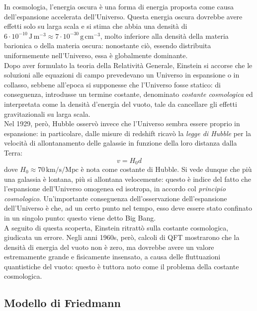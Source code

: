 In cosmologia, l'energia oscura è una forma di energia proposta come causa dell'espansione accelerata dell'Universo. Questa energia oscura dovrebbe avere effetti solo su larga scala e si stima che abbia una densità di $ 6 \cdot 10^{-10} \,\text{J} \,\text{m}^{-3} \approx 7 \cdot 10^{-30} \,\text{g} \,\text{cm}^{-3} $, molto inferiore alla densità della materia barionica o della materia oscura: nonostante ciò, essendo distribuita uniformemente nell'Universo, essa è globalmente dominante.\\
Dopo aver formulato la teoria della Relatività Generale, Einstein si accorse che le soluzioni alle equazioni di campo prevedevano un Universo in espansione o in collasso, sebbene all'epoca si supponesse che l'Universo fosse statico: di conseguenza, introdusse un termine costante, denominato \textit{costante cosmologica} ed interpretata come la densità d'energia del vuoto, tale da cancellare gli effetti gravitazionali su larga scala.\\
Nel 1929, però, Hubble osservò invece che l'Universo sembra essere proprio in espansione: in particolare, dalle misure di redshift ricavò la \textit{legge di Hubble} per la velocità di allontanamento delle galassie in funzione della loro distanza dalla Terra:
\begin{equation}
	v = H_0 d
	\label{eq:11.4}
\end{equation}
dove $ H_0 \approx 70 \,\text{km}/\text{s} / \text{Mpc} $ è nota come costante di Hubble. Si vede dunque che più una galassia è lontana, più si allontana velocemente: questo è indice del fatto che l'espansione dell'Universo omogenea ed isotropa, in accordo col \textit{principio cosmologico}. Un'importante conseguenza dell'osservazione dell'espansione dell'Universo è che, ad un certo punto nel tempo, esso deve essere stato confinato in un singolo punto: questo viene detto Big Bang.\\
A seguito di questa scoperta, Einstein ritrattò sulla costante cosmologica, giudicata un errore. Negli anni 1960s, però, calcoli di QFT mostrarono che la densità di energia del vuoto non è zero, ma dovrebbe avere un valore estremamente grande e fisicamente insensato, a causa delle fluttuazioni quantistiche del vuoto: questo è tuttora noto come il problema della costante cosmologica.

\subsection{Modello di Friedmann}

